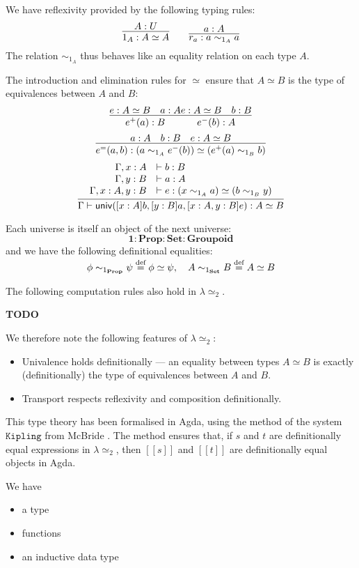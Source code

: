 \documentclass{easychair}
\newcommand{\Prop}{\ensuremath{\mathbf{Prop}}}
\newcommand{\Set}{\ensuremath{\mathbf{Set}}}
\newcommand{\Groupoid}{\ensuremath{\mathbf{Groupoid}}}
\newcommand{\LEtwo}{\ensuremath{\lambda \simeq_2}}
\newcommand{\eqdef}{\mathrel{\smash{\stackrel{\text{def}}{=}}}}
\newcommand{\brackets}[1]{\ensuremath{[ \! [ {#1} ] \! ]}}
\begin{document}
We have reflexivity provided by the following typing rules:
\[ \infer{1_A : A \simeq A}{A : U} \qquad \infer{r_a : a \sim_{1_A} a}{a : A} \]
The relation $\sim_{1_A}$ thus behaves like an equality relation on each type $A$.

The introduction and elimination rules for $\simeq$ ensure that $A \simeq B$ is the type of equivalences between $A$ and $B$:
\[ \infer{e^+(a) : B}{e : A \simeq B \quad a : A} \infer{e^-(b) : A}{e : A \simeq B \quad b : B} \]
\[ \infer{e^=(a,b) : (a \sim_{1_A} e^-(b)) \simeq (e^+(a) \sim_{1_B} b)}{a : A \quad b : B \quad e : A \simeq B} \]
\[ \infer{\Gamma \vdash \mathsf{univ}([x : A] b, [y : B] a, [x : A, y : B]e) : A \simeq B}{\begin{array}{rl}
\Gamma, x : A & \vdash b : B \\
\Gamma, y : B & \vdash a : A \\
\Gamma, x : A, y : B & \vdash e : (x \sim_{1_A} a) \simeq (b \sim_{1_B} y)
\end{array}} \]

Each universe is itself an object of the next universe:
\[ \mathbf{1} : \Prop : \Set : \Groupoid \]
and we have the following definitional equalities:
\[ \phi \sim_{1_\Prop} \psi \eqdef \phi \simeq \psi, \quad
A \sim_{1_\Set} B \eqdef A \simeq B \]

The following computation rules also hold in $\LEtwo$.

\textbf{TODO}

We therefore note the following features of $\LEtwo$:
\begin{itemize}
\item
Univalence holds definitionally --- an equality between types $A \simeq B$ is exactly (definitionally) the type of equivalences between $A$ and $B$.
\item
Transport respects reflexivity and composition definitionally.
\end{itemize}

This type theory has been formalised in Agda, using the method of the system $\mathtt{Kipling}$ from McBride \cite{McBridea}.  The method ensures that, if $s$ and $t$ are definitionally equal expressions in $\lambda \simeq_2$, then $\brackets{s}$ and $\brackets{t}$ are definitionally equal objects in Agda.

We have
\begin{itemize}
\item
a type 
\item
functions
\item
an inductive data type
\end{itemize}
\end{document}
